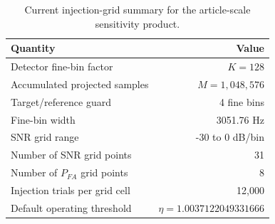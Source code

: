 \begin{table}[ht]
\centering
\caption{Current injection-grid summary for the article-scale sensitivity product.}
\label{tab:injection-grid}
\begin{tabular}{l r}
\toprule
Quantity & Value \\
\midrule
Detector fine-bin factor & $K=128$ \\
Accumulated projected samples & $M=1,048,576$ \\
Target/reference guard & 4 fine bins \\
Fine-bin width & 3051.76 Hz \\
SNR grid range & -30 to 0 dB/bin \\
Number of SNR grid points & 31 \\
Number of $P_{FA}$ grid points & 8 \\
Injection trials per grid cell & 12,000 \\
Default operating threshold & $\eta=1.0037122049331666$ \\
\bottomrule
\end{tabular}
\end{table}
